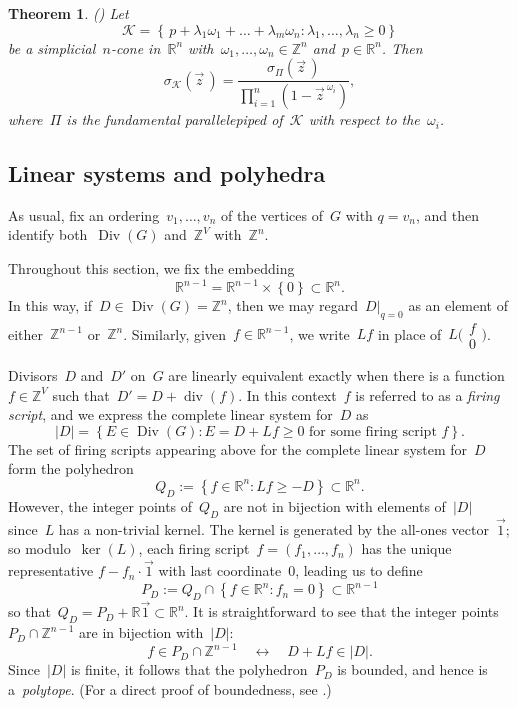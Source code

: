 \documentclass{amsart}
\newtheorem{thm}{Theorem}[section]
\DeclareMathOperator{\Div}{Div}
\DeclareMathOperator{\smalldiv}{div}
\newcommand{\Z}{\mathbb{Z}}
\newcommand{\R}{\mathbb{R}}
\newcommand{\K}{\mathcal{K}}
\begin{document}
\begin{thm}\label{thm: polyhedral generating function} {\rm (\cite[Theorem 3.5]{Beck})}  Let
  \[
    \K = \left\{\,
  p+\lambda_1\omega_1+\dots+\lambda_m\omega_n:\lambda_1,\dots,\lambda_n\geq0 \right\}
  \]
  be a simplicial~$n$-cone in~$\R^n$ with~$\omega_1,\dots,\omega_n\in\Z^n$
  and~$p\in\R^n$.  Then
  \[
    \sigma_{\K}(\vec{z}\,)=\frac{\sigma_{\Pi}(\vec{z}\,)}{\prod_{i=1}^{n}(1-\vec{z}^{\
    \omega_i})},
  \]
  where~$\Pi$ is the fundamental parallelepiped of~$\K$ with respect to the~$\omega_i$.
\end{thm}

\subsection{Linear systems and polyhedra} 
As usual, fix an ordering~$v_1,\dots,v_n$ of the vertices of~$G$ with $q=v_n$, and
then identify both~$\Div(G)$ and~$\Z^V$ with~$\Z^n$. 
\medskip

 Throughout this section, we
fix the embedding
\[
  \R^{n-1}=\R^{n-1}\times\left\{ 0 \right\}\subset\R^{n}.
\]
In this way, if~$D\in\Div(G)=\Z^n$, then we may regard~$D|_{q=0}$ as an element of
either~$\Z^{n-1}$ or~$\Z^n$.  Similarly, given~$f\in\R^{n-1}$, we write~$Lf$ in place
of~$L\bigl(\begin{smallmatrix}f\\0\end{smallmatrix}\bigr)$.
\smallskip

Divisors~$D$ and~$D'$ on~$G$ are linearly
equivalent exactly when there is a function~$f\in\Z^V$ such
that~$D'=D+\smalldiv(f)$. In this context~$f$ is referred to as a {\em firing
script}, and we express the complete linear system for~$D$ as
\[
  |D|=\left\{ E\in\Div(G): E = D+Lf\geq0 \text{ for some firing
  script~$f$}\right\}.
\]
The set of firing scripts appearing above for the complete linear system for~$D$
form the polyhedron
\[
  Q_D :=\left\{f\in\R^n: Lf\geq -D\right\}\subset\R^n.    
\]
However, the integer points of~$Q_D$ are not in bijection with elements of~$|D|$
since~$L$ has a non-trivial kernel.  The kernel is generated by the
all-ones vector~$\vec{1}$; so modulo~$\ker(L)$, each firing
script~$f=(f_1,\dots,f_n)$ has the unique
representative $f-f_n\cdot\vec{1}$ with last coordinate~$0$,
leading us to define
\[
  P_D:=Q_D\cap\left\{f\in\R^n: f_n=0 \right\}\subset\R^{n-1}
\]
so that~$Q_D=P_D+\R\vec{1}\subset\R^n$.
It is straightforward to see that the integer points~$P_D\cap\Z^{n-1}$ are in
bijection with~$|D|$:
\begin{equation}\label{eqn: polytope bijection}
  f\in P_D\cap\Z^{n-1}\quad\longleftrightarrow\quad
  D+Lf\in|D|.
\end{equation}
Since~$|D|$ is finite, it follows that the polyhedron~$P_D$ is bounded, and hence is
a~{\em polytope}. (For a direct proof of boundedness, see
\cite[Proposition~2.20]{Corry}.)
\end{document}
